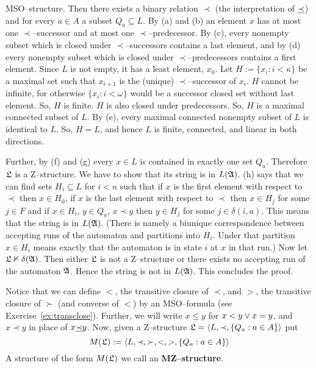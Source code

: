 MSO--structure. Then there exists a binary relation
$\prec$ (the interpretation of $\underline{\prec}$) and for every
$a \in A$ a subset $Q_a \subseteq L$. By (a) and (b)
an element $x$ has at most one $\prec$--successor and at most 
one $\prec$--predecessor. By (c), every nonempty subset which 
is closed under $\prec$--successors contains a last element,  and
by (d) every nonempty subset which is closed under $\prec$--predecessors
contains a first element. Since $L$ is not empty, it has a least 
element, $x_0$. Let $H := \{x_i : i < \kappa\}$ be a maximal set 
such that $x_{i+1}$ is the (unique) $\prec$--successor of $x_i$.  
$H$ cannot be infinite, for otherwise $\{x_i : i < \omega\}$ 
would be a successor closed set without last element. So, $H$ 
is finite. $H$ is also closed under predecessors. So, $H$ is a 
maximal connected subset of $L$. By (e), every maximal connected 
nonempty subset of $L$ is identical to $L$. So, $H = L$, and hence
$L$ is finite, connected, and linear in both directions.

Further, by (f) and (g) every $x \in L$ is contained in exactly one 
set $Q_a$. Therefore $\mathfrak{L}$ is a Z--structure. We have to show that its 
string is in $L(\mathfrak{A})$. (h) says that we can find sets 
$H_i \subseteq L$ for $i < n$ such that if $x$ is the first element 
with respect to $\prec$ then $x \in H_0$, if $x$ is the last element 
with respect to $\prec$ then $x \in H_j$ for some $j \in F$ and if 
$x \in  H_i$, $y \in Q_a$, $x \prec y$ then $y \in H_j$ for some 
$j \in \delta(i,a)$. This means that the string is in $L(\mathfrak{A})$. (There 
is namely a biunique correspondence between accepting runs of the 
automaton and partitions into $H_i$. Under that partition $x \in H_i$ 
means exactly that the automaton is in state $i$ at $x$ in that run.) 
Now let $\mathfrak{L} \nvDash \delta(\mathfrak{A})$. Then either $\mathfrak{L}$ is not a 
Z--structure or there exists no accepting run of the automaton $\mathfrak{A}$. 
Hence the string is not in $L(\mathfrak{A})$.
This concludes the proof.
\proofend

Notice that we can define $<$, the transitive closure of $\prec$, and
$>$, the transitive closure of $\succ$ (and converse of $<$) by an 
MSO--formula (see Exercise~\ref{ex:transclose}). 
Further, we will write $x \leq y$ for $x < y \vee x = y$, 
and $x \prec y$ in place of $x \underline{\prec} y$. Now, given a 
Z--structure $\mathfrak{L} = \langle L, \prec, \{Q_a : a \in A\}\rangle$ put
\begin{equation}
M(\mathfrak{L}) := \langle L, \prec, \succ, <, >, \{Q_a : a \in A\}\rangle 
\end{equation}
A structure of the form $M(\mathfrak{L})$ we call an \textbf{MZ--structure}.

